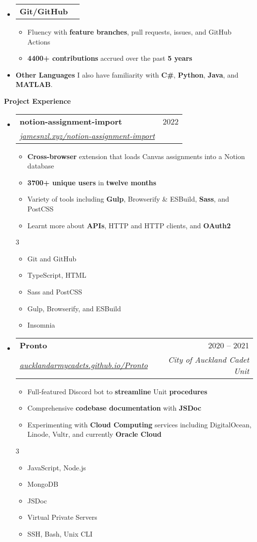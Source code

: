\documentclass[11pt,a4paper]{article}[leftmargin=*]
\makeatletter
\def \entryspacing {-0pt}
\def \bulletstylei {\faAngleRight\hspace{-4.5pt}}
\def \bulletstyleii {\faCaretRight\hspace{-4.5pt}}
\renewcommand{\section}[2]{\vspace{5pt}
  \colorbox{secondary}{\color{white}\raggedbottom\normalsize\textbf{{#1}{\hspace{2pt}#2\hspace{4pt}}}}
}
\newcommand{\resumeEntryStart}{\begin{itemize}[leftmargin=2.5mm]}
\newcommand{\resumeEntryEnd}{\end{itemize}\vspace{\entryspacing}}
\newcommand{\resumeItemListStart}{\begin{itemize}[leftmargin=4.5mm]}
\newcommand{\resumeItemListEnd}{\end{itemize}}
\newcommand{\resumeItemListStartColumns}[2][-0.5]{\vspace*{#1\multicolsep}
\begin{multicols}{#2}\begin{itemize}[leftmargin=4.5mm]}
\newcommand{\resumeItemListEndColumns}[1][-1]{\end{itemize}\end{multicols}\vspace*{#1\multicolsep}}
\newcommand{\resumeItem}[2][\bulletstylei]{
  \item[\small#1]\small{
    {#2 \vspace{-2pt}}
  }
}
\newcommand{\resumeEntryTSDL}[4]{
  \vspace{-1pt}\item[]
    \begin{tabularx}{0.97\textwidth}{X@{\hspace{60pt}}r}
      \textbf{\color{primary}#1} & {\firabook\color{accent}\small#2} \\
      \textit{\color{accent}\small#3} & \textit{\color{accent}\small#4} \\
    \end{tabularx}\vspace{-6pt}
}
\newcommand{\resumeEntryTD}[2]{
  \vspace{-1pt}\item[]
    \begin{tabularx}{0.97\textwidth}{X@{\hspace{60pt}}r}
      \textbf{\color{primary}#1} & {\firabook\color{accent}\small#2} \\
    \end{tabularx}\vspace{-6pt}
}
\newcommand{\resumeEntryS}[2]{
  \item[]\small{
    \textbf{\color{primary}#1 }{ #2 \vspace{-4pt}}
  }
}
\newcommand{\resumeBf}[1]{\small\textbf{\color{halfbold}#1}}
\makeatother
\begin{document}
\resumeEntryStart
\resumeEntryTD
{Git/GitHub}{}
\resumeItemListStart
\resumeItem {Fluency with \resumeBf{feature branches}, pull requests, issues, and GitHub Actions}
\resumeItem {\resumeBf{4400+ contributions} accrued over the past \resumeBf{5 years}}
\resumeItemListEnd
\resumeEntryEnd

\resumeEntryStart
\resumeEntryS
{Other Languages}{I also have familiarity with \resumeBf{C\#}, \resumeBf{Python}, \resumeBf{Java}, and \resumeBf{MATLAB}.}
\resumeEntryEnd

\pagebreak


\section{\faFlask}{Project Experience}

\resumeEntryStart
\resumeEntryTSDL
{notion-assignment-import}{2022}
{\href{https://jamesnzl.xyz/notion-assignment-import}{jamesnzl.xyz/notion-assignment-import}}{}
\resumeItemListStart
\resumeItem {\resumeBf{Cross-browser} extension that loads Canvas assignments into a Notion database}
\resumeItem {\resumeBf{3700+ unique users} in \resumeBf{twelve months}}
\resumeItem {Variety of tools including \resumeBf{Gulp}, Browserify \& ESBuild, \resumeBf{Sass}, and PostCSS}
\resumeItem {Learnt more about \resumeBf{APIs}, HTTP and HTTP clients, and \resumeBf{OAuth2}}
\resumeItemListEnd
\resumeItemListStartColumns{3}
\resumeItem[\bulletstyleii] {Git and GitHub}
\resumeItem[\bulletstyleii] {TypeScript, HTML}
\resumeItem[\bulletstyleii] {Sass and PostCSS}
\resumeItem[\bulletstyleii] {Gulp, Browserify, and ESBuild}
\resumeItem[\bulletstyleii] {Insomnia}
\resumeItemListEndColumns
\resumeEntryEnd

\resumeEntryStart
\resumeEntryTSDL
{Pronto}{2020 -- 2021}
{\href{https://aucklandarmycadets.github.io/Pronto/}{aucklandarmycadets.github.io/Pronto}}{City of Auckland Cadet Unit}
\resumeItemListStart
\resumeItem {Full-featured Discord bot to \resumeBf{streamline} Unit \resumeBf{procedures}}
\resumeItem {Comprehensive \resumeBf{codebase documentation} with \resumeBf{JSDoc}}
\resumeItem {Experimenting with \resumeBf{Cloud Computing} services including DigitalOcean, Linode, Vultr, and currently \resumeBf{Oracle Cloud}}
\resumeItemListEnd
\resumeItemListStartColumns{3}
\resumeItem[\bulletstyleii] {JavaScript, Node.js}
\resumeItem[\bulletstyleii] {MongoDB}
\resumeItem[\bulletstyleii] {JSDoc}
\resumeItem[\bulletstyleii] {Virtual Private Servers}
\resumeItem[\bulletstyleii] {SSH, Bash, Unix CLI}
\resumeItemListEndColumns
\resumeEntryEnd
\end{document}

